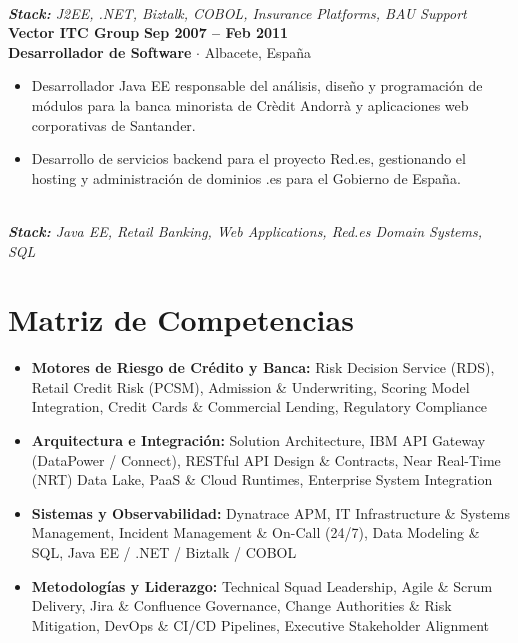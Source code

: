 \documentclass[10pt,a4paper]{article}
\begin{document}
\\\noindent\textit{\footnotesize \textbf{Stack:} J2EE, .NET, Biztalk, COBOL, Insurance Platforms, BAU Support}
\vspace{10pt}
\noindent\textbf{\large Vector ITC Group} \hfill {\color{SynthBlue}\textbf{Sep 2007 -- Feb 2011}} \\
{\color{SynthPink}\textbf{Desarrollador de Software}} $\cdot$ {\color{SlateGray}Albacete, España}
\begin{itemize}[leftmargin=1.5em, itemsep=1.5pt, topsep=2pt]
    \item Desarrollador Java EE responsable del análisis, diseño y programación de módulos para la banca minorista de Crèdit Andorrà y aplicaciones web corporativas de Santander.
    \item Desarrollo de servicios backend para el proyecto Red.es, gestionando el hosting y administración de dominios .es para el Gobierno de España.
\end{itemize}
\\\noindent\textit{\footnotesize \textbf{Stack:} Java EE, Retail Banking, Web Applications, Red.es Domain Systems, SQL}
\vspace{10pt}


\section{Matriz de Competencias}
\begin{itemize}[leftmargin=1.5em, itemsep=2pt, topsep=2pt]
\item \textbf{Motores de Riesgo de Crédito y Banca:} Risk Decision Service (RDS), Retail Credit Risk (PCSM), Admission \& Underwriting, Scoring Model Integration, Credit Cards \& Commercial Lending, Regulatory Compliance\item \textbf{Arquitectura e Integración:} Solution Architecture, IBM API Gateway (DataPower / Connect), RESTful API Design \& Contracts, Near Real-Time (NRT) Data Lake, PaaS \& Cloud Runtimes, Enterprise System Integration\item \textbf{Sistemas y Observabilidad:} Dynatrace APM, IT Infrastructure \& Systems Management, Incident Management \& On-Call (24/7), Data Modeling \& SQL, Java EE / .NET / Biztalk / COBOL\item \textbf{Metodologías y Liderazgo:} Technical Squad Leadership, Agile \& Scrum Delivery, Jira \& Confluence Governance, Change Authorities \& Risk Mitigation, DevOps \& CI/CD Pipelines, Executive Stakeholder Alignment
\end{itemize}
\end{document}
